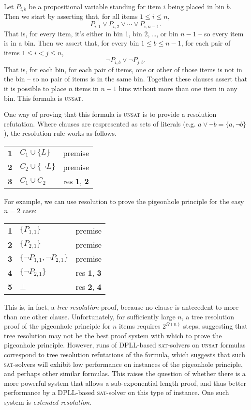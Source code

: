 \documentclass[11pt]{article}
\newcommand{\sat}{\textsc{sat}}
\newcommand{\unsat}{\textsc{unsat}}
\begin{document}
Let $P_{i,b}$ be a propositional variable standing for item $i$ being placed in bin $b$. Then we start by asserting that, for all items $1 \leq i \leq n$,
\[P_{i,1} \vee P_{i,2} \vee \cdots \vee P_{i,n-1}.\]
That is, for every item, it's either in bin 1, bin 2, \dots, or bin $n-1$ -- so every item is in a bin. Then we assert that, for every bin $1 \leq b \leq n-1$, for each pair of items $1 \leq i < j \leq n$,
\[\neg P_{i,b} \vee \neg P_{j,b}.\]
That is, for each bin, for each pair of items, one or other of those items is not in the bin -- so no pair of items is in the same bin. Together these clauses assert that it is possible to place $n$ items in $n-1$ bins without more than one item in any bin. This formula is \unsat.

One way of proving that this formula is \unsat{} is to provide a resolution refutation. Where clauses are respresented as sets of literals (e.g. $a \vee \neg b = \{a, \neg b\}$), the resolution rule works as follows.

\begin{table}[h]
  \begin{tabular}{lll}
    {\bf 1} & $C_1 \cup \{L\}$ & premise \\
    {\bf 2} & $C_2 \cup \{\neg L\}$ & premise \\
    {\bf 3} & $C_1 \cup C_2$ & res {\bf 1}, {\bf 2}
  \end{tabular}
\end{table}
\FloatBarrier

For example, we can use resolution to prove the pigeonhole principle for the easy $n = 2$ case:

\begin{table}[h]
  \begin{tabular}{lll}
    {\bf 1} & $\{P_{1,1}\}$ & premise \\
    {\bf 2} & $\{P_{2,1}\}$ & premise \\
    {\bf 3} & $\{\neg P_{1,1}, \neg P_{2,1}\}$ & premise \\
    {\bf 4} & $\{\neg P_{2,1}\}$ & res {\bf 1}, {\bf 3} \\
    {\bf 5} & $\bot$ & res {\bf 2}, {\bf 4}
  \end{tabular}
\end{table}
\FloatBarrier

This is, in fact, a \emph{tree resolution} proof, because no clause is antecedent to more than one other clause. Unfortunately, for sufficiently large $n$, a tree resolution proof of the pigeonhole principle for $n$ items requires $2^{\Omega(n)}$ steps, suggesting that tree resolution may not be the best proof system with which to prove the pigeonhole principle.
However, runs of DPLL-based \sat{}-solvers on \unsat{} formulas correspond to tree resolution refutations of the formula, which suggests that such \sat{}-solvers will exhibit low performance on instances of the pigeonhole principle, and perhaps other similar formulas.
This raises the question of whether there is a more powerful system that allows a sub-exponential length proof, and thus better performance by a DPLL-based \sat{}-solver on this type of instance. One such system is \emph{extended resolution}.
\end{document}

